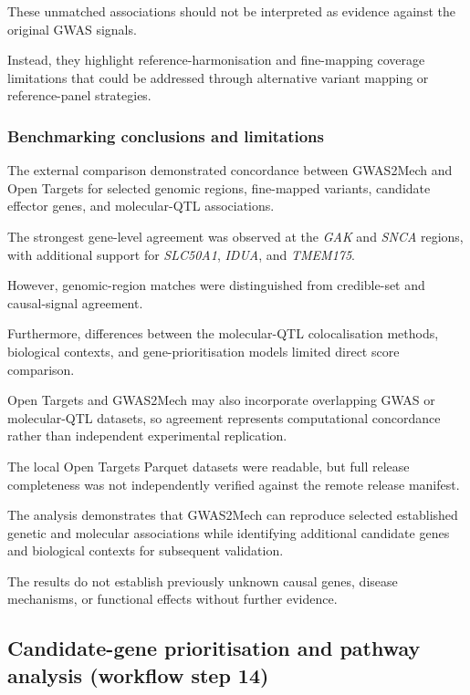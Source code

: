 \documentclass[11pt,a4paper]{article}
\begin{document}
These unmatched associations should
not be interpreted as evidence
against the original GWAS signals.

Instead, they highlight
reference-harmonisation and
fine-mapping coverage limitations
that could be addressed through
alternative variant mapping or
reference-panel strategies.


\subsubsection{Benchmarking conclusions and limitations}

The external comparison demonstrated
concordance between GWAS2Mech and
Open Targets for selected genomic
regions, fine-mapped variants,
candidate effector genes, and
molecular-QTL associations.

The strongest gene-level agreement
was observed at the \textit{GAK}
and \textit{SNCA} regions, with
additional support for
\textit{SLC50A1}, \textit{IDUA},
and \textit{TMEM175}.

However, genomic-region matches
were distinguished from
credible-set and causal-signal
agreement.

Furthermore, differences between
the molecular-QTL colocalisation
methods, biological contexts,
and gene-prioritisation models
limited direct score comparison.

Open Targets and GWAS2Mech may
also incorporate overlapping GWAS
or molecular-QTL datasets, so
agreement represents computational
concordance rather than independent
experimental replication.

The local Open Targets Parquet
datasets were readable, but full
release completeness was not
independently verified against
the remote release manifest.

The analysis demonstrates that
GWAS2Mech can reproduce selected
established genetic and molecular
associations while identifying
additional candidate genes and
biological contexts for subsequent
validation.

The results do not establish
previously unknown causal genes,
disease mechanisms, or functional
effects without further evidence.
\subsection{Candidate-gene prioritisation and pathway analysis (workflow step 14)}
\label{sec:step14}
\end{document}
